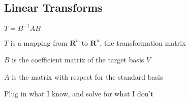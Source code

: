 \documentclass[10pt,letterpaper]{article}
\newenvironment{tight_item}
{\begin{itemize}
\setlength{\parskip}{0pt}
\setlength{\parsep}{0pt}
\setlength{\itemsep}{0pt}
\setlength{\parsep}{0pt}
\setlength{\topsep}{0pt}
\setlength{\partopsep}{0pt}
\setlength{\leftmargin}{0em}
\setlength{\labelwidth}{0em}
\setlength{\labelsep}{0em} }
{\end{itemize}}
\newenvironment{tight_enum}
{\begin{enumerate}
\setlength{\parskip}{0pt}
\setlength{\parsep}{0pt}
\setlength{\itemsep}{0pt}
\setlength{\parsep}{0pt}
\setlength{\topsep}{0pt}
\setlength{\partopsep}{0pt}
\setlength{\leftmargin}{0em}
\setlength{\labelwidth}{0em}
\setlength{\labelsep}{0em} }
{\end{enumerate}}
\begin{document}
{\begin{multicols*}{5}
\section{Linear Transforms}
\begin{center}
$T = B^{-1}AB$
\end{center}
\begin{tight_item}
\item $T$ is a mapping from $\textbf{R}^{n}$ to $\textbf{R}^{n}$, the transformation matrix
\item $B$ is the coefficient matrix of the target basis $V$
\item $A$ is the matrix with respect for the standard basis
\end{tight_item}
\begin{tight_enum}
\item Plug in what I know, and solve for what I don't
\end{tight_enum}


\end{multicols*}}
\end{document}
